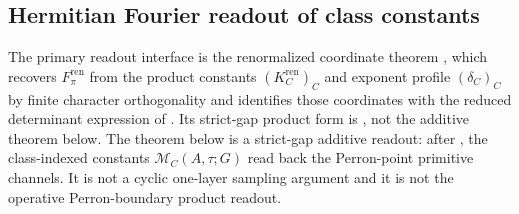 \subsection{Hermitian Fourier readout of class constants}

The primary readout interface is the renormalized coordinate theorem
, which recovers
\(F_\pi^{\mathrm{ren}}\) from the product constants
\((K_C^{\mathrm{ren}})_C\) and exponent profile \((\delta_C)_C\) by finite
character orthogonality and identifies those coordinates with the reduced
determinant expression of
.  Its strict-gap product form
is , not the additive theorem below.  The
theorem below is a strict-gap additive readout: after
, the
class-indexed constants \(\mathcal M_C(A,\tau;G)\) read back the Perron-point
primitive channels.  It is not a cyclic one-layer sampling argument and it is
not the operative Perron-boundary product readout.

